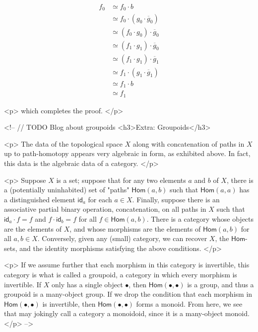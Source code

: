 $$
\begin{align*}
    f_0
    &\simeq f_0 \cdot b \tag{right identity} \\
    &\simeq f_0 \cdot (g_0  \cdot \overline{g}_0) \tag{right inverse} \\
    &\simeq (f_0 \cdot g_0) \cdot \overline{g}_0  \tag{associativity} \\
    &\simeq (f_1 \cdot g_1) \cdot \overline{g}_0  \tag{hypothesis} \\
    &\simeq (f_1 \cdot g_1) \cdot \overline{g}_1  \tag{hypothesis + well-defined inverse}\\
    &\simeq f_1 \cdot (g_1  \cdot \overline{g}_1) \tag{associativity} \\
    &\simeq f_1 \cdot b \tag{right inverse} \\
    &\simeq f_1 \tag{right identity}
\end{align*}
$$

<p>
    which completes the proof.
</p>


<!--
// TODO Blog about groupoids
<h3>Extra: Groupoids</h3>

<p>
    The data of the topological space $X$ along with concatenation of paths in $X$ up to path-homotopy appears very algebraic in form, as exhibited above. In fact, this data is the algebraic data of a category.
</p>

<p>
    Suppose $X$ is a set; suppose that for any two elements $a$ and $b$ of $X$, there is a (potentially uninhabited) set of "paths" $\mathsf{Hom}(a,b)$ such that $\mathsf{Hom}(a,a)$ has a distinguished element $\mathsf{id}_a$ for each $a \in X$. Finally, suppose there is an associative partial binary operation, concatenation, on all paths in $X$ such that $\mathsf{id}_a \cdot f = f$ and $f \cdot \mathsf{id}_b = f$ for all $f \in \mathsf{Hom}(a,b)$. There is a category whose objects are the elements of $X$, and whose morphisms are the elements of $\mathsf{Hom}(a,b)$ for all $a,b \in X$. Conversely, given any (small) category, we can recover $X$, the $\mathsf{Hom}$-sets, and the identity morphisms satisfying the above conditions.
</p>

<p>
    If we assume further that each morphism in this category is invertible, this category is what is called a groupoid, a category in which every morphism is invertible. If $X$ only has a single object $\bullet$, then $\mathsf{Hom}(\bullet,\bullet)$ is a group, and thus a groupoid is a many-object group. If we drop the condition that each morphism in $\mathsf{Hom}(\bullet,\bullet)$ is invertible, then $\mathsf{Hom}(\bullet,\bullet)$ forms a monoid. From here, we see that may jokingly call a category a monoidoid, since it is a many-object monoid.
</p>
-->